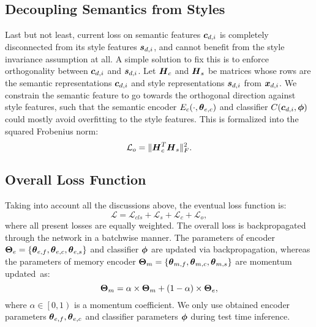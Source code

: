 \documentclass[10pt,twocolumn,letterpaper]{article}
\newcommand{\bc}{\mbox{\boldmath $c$}}
\newcommand{\bs}{\mbox{\boldmath $s$}}
\newcommand{\bx}{\mbox{\boldmath $x$}}
\newcommand{\bH}{\mbox{\boldmath $H$}}
\newcommand{\btheta}{\mbox{\boldmath $\theta$}}
\newcommand{\bphi}{\mbox{\boldmath $\phi$}}
\newcommand{\bTheta}{\mbox{\boldmath $\Theta$}}
\newcommand{\0}{{\bf 0}}
\begin{document}
\subsection{Decoupling Semantics from Styles}
Last but not least, current loss on semantic features $\bc_{d,i}$ is completely disconnected from its style features $\bs_{d,i}$, and cannot benefit from the style invariance assumption at all. A simple solution to fix this is to enforce orthogonality \cite{bousmalis2016domain} between $\bc_{d,i}$ and $\bs_{d,i}$. Let $\bH_c$ and $\bH_s$ be matrices whose rows are the semantic representations $\bc_{d,i}$ and style representations $\bs_{d,i}$ from $\bx_{d,i}$. We constrain the semantic feature to go towards the orthogonal direction against style features, such that the semantic encoder $E_c(\cdot, \btheta_{e, c})$ and classifier $C( \bc_{d,i}, \bphi)$ could mostly avoid overfitting to the style features. This is formalized into the squared Frobenius norm:
\begin{equation}
\mathcal{L}_o = \| \bH^{T}_c \bH_s \|^{2}_F.
\label{eq:orthogonal}
\end{equation}

\subsection{Overall Loss Function}
Taking into account all the discussions above, the eventual loss function is:
\begin{equation}
\mathcal{L}=\mathcal{L}_{cls}+ \mathcal{L}_{s}+ \mathcal{L}_{c}+  \mathcal{L}_{o},
\label{eq:finalloss}
\end{equation}
where all present losses are equally weighted. The overall loss is backpropagated through the network in a batchwise manner. The parameters of encoder $\bTheta_{e}=\{\btheta_{e, f},\btheta_{e, c},\btheta_{e, s}\}$ and classifier $\bphi$ are updated via backpropagation, whereas the parameters of memory encoder $\bTheta_m=\{\btheta_{m, f},\btheta_{m, c},\btheta_{m, s}\}$ are momentum updated~as:
\begin{equation}
\bTheta_m = \alpha \times \bTheta_m + (1-\alpha) \times \bTheta_e,
\end{equation}
where  $\alpha \in \left[0, 1 \right)$ is a momentum coefficient. We only use obtained encoder parameters $\btheta_{e, f},\btheta_{e, c}$ and classifier parameters $\bphi$ during test time inference.
\end{document}
